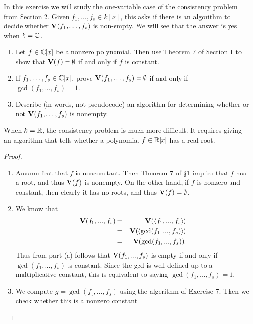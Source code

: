 \begin{exercise}{11}
In this exercise we will study the one-variable case of the consistency problem from Section 2. Given $f_1,\dots,f_s\in k[x]$, this asks if there is an algorithm to decide whether $\mathbf{V}(f_1,\dots,f_s)$ is non-empty. We will see that the answer is yes when $k=\mathbb{C}$.
\begin{enumerate}
    \item Let $f\in\mathbb{C}[x]$ be a nonzero polynomial. Then use Theorem 7 of Section 1 to show that $\mathbf{V}(f) =\emptyset$ if and only if $f$ is constant.
    \item If $f_1,\dots,f_s\in\mathbb{C}[x]$, prove $\mathbf{V}(f_1,\dots,f_s) =\emptyset$ if and only if $\gcd(f_1,\dots,f_s) =1$.
    \item Describe (in words, not pseudocode) an algorithm for determining whether or not $\mathbf{V}(f_1,\dots,f_s)$ is nonempty.
\end{enumerate}
When $k=\mathbb{R}$, the consistency problem is much more difficult. It requires giving an algorithm that tells whether a polynomial $f\in\mathbb{R}[x]$ has a real root.
\end{exercise}
\begin{proof}
\begin{enumerate}
    \item Assume first that $f$ is nonconstant. Then Theorem $7$ of \S 1 implies that $f$ has a root, and thus $\mathbf{V}(f)$ is nonempty. On the other hand, if $f$ is nonzero and constant, then clearly it has no roots, and thus $\mathbf{V}(f) = \emptyset$.
    \item We know that
    \begin{eqnarray*}
        \mathbf{V}(f_1,...,f_s)
        & = & \mathbf{V}(\langle f_1,...,f_s\rangle)\\
        & = & \mathbf{V}(\langle \gcd(f_1,...,f_s)\rangle)\\
        & = & \mathbf{V}(\gcd(f_1,...,f_s)).
    \end{eqnarray*}
    Thus from part (a) follows that $\mathbf{V}(f_1,...,f_s)$ is empty if and only if $\gcd(f_1,...,f_s)$ is constant. Since the gcd is well-defined up to a multiplicative constant, this is equivalent to saying $\gcd(f_1,...,f_s) = 1$.
    \item We compute $g = \gcd(f_1,...,f_s)$ using the algorithm of Exercise $7$. Then we check whether this is a nonzero constant.
\end{enumerate}
\end{proof}

